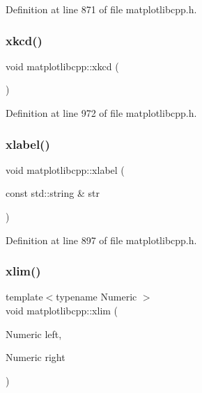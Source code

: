 Definition at line 871 of file matplotlibcpp.\+h.

\mbox{\label{namespacematplotlibcpp_aca0fdbeae2fd86ab7291661f154f83ff}} 
\subsubsection{\texorpdfstring{xkcd()}{xkcd()}}
{\footnotesize\ttfamily void matplotlibcpp\+::xkcd (\begin{DoxyParamCaption}{ }\end{DoxyParamCaption})\hspace{0.3cm}{\ttfamily [inline]}}



Definition at line 972 of file matplotlibcpp.\+h.

\mbox{\label{namespacematplotlibcpp_a8b8f1bb0cc3640fe5140f5a012e4a1c0}} 
\subsubsection{\texorpdfstring{xlabel()}{xlabel()}}
{\footnotesize\ttfamily void matplotlibcpp\+::xlabel (\begin{DoxyParamCaption}\item[{const std\+::string \&}]{str }\end{DoxyParamCaption})\hspace{0.3cm}{\ttfamily [inline]}}



Definition at line 897 of file matplotlibcpp.\+h.

\mbox{\label{namespacematplotlibcpp_a712cd34472b3687668048899bee4cdbf}} 
\subsubsection{\texorpdfstring{xlim()}{xlim()}\hspace{0.1cm}{\footnotesize\ttfamily [1/2]}}
{\footnotesize\ttfamily template$<$typename Numeric $>$ \\
void matplotlibcpp\+::xlim (\begin{DoxyParamCaption}\item[{Numeric}]{left,  }\item[{Numeric}]{right }\end{DoxyParamCaption})}



